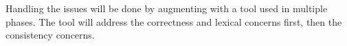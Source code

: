 Handling the {\bibtex} issues will be done by augmenting {\bibtex}
with a tool used in multiple phases.  The tool will address the
correctness and lexical concerns first, then the consistency concerns.




